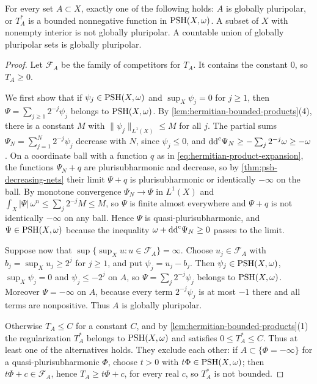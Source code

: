 \begin{lemma}\label{lem:hermitian-extremal-pole-alternative}
For every set $A\subset X$, exactly one of the following holds: $A$ is globally pluripolar, or $T_A^*$ is a bounded nonnegative function in $\mathrm{PSH}(X,\omega)$. A subset of $X$ with nonempty interior is not globally pluripolar. A countable union of globally pluripolar sets is globally pluripolar.
\end{lemma}
\begin{proof}
Let $\mathcal F_A$ be the family of competitors for $T_A$. It contains the constant $0$, so $T_A\geq0$.

We first show that if $\psi_j\in\mathrm{PSH}(X,\omega)$ and $\sup_X\psi_j=0$ for $j\geq1$, then $\Psi=\sum_{j\geq1}2^{-j}\psi_j$ belongs to $\mathrm{PSH}(X,\omega)$. By \cref{lem:hermitian-bounded-products}(4), there is a constant $M$ with $\|\psi_j\|_{L^1(X)}\leq M$ for all $j$. The partial sums $\Psi_N=\sum_{j=1}^N2^{-j}\psi_j$ decrease with $N$, since $\psi_j\leq0$, and $\mathrm{dd}^{\mathrm{c}}\Psi_N\geq-\sum_j2^{-j}\omega\geq-\omega$. On a coordinate ball with a function $q$ as in \eqref{eq:hermitian-product-expansion}, the functions $\Psi_N+q$ are plurisubharmonic and decrease, so by \cref{thm:psh-decreasing-nets} their limit $\Psi+q$ is plurisubharmonic or identically $-\infty$ on the ball. By monotone convergence $\Psi_N\to\Psi$ in $L^1(X)$ and $\int_X|\Psi|\,\omega^n\leq\sum_j2^{-j}M\leq M$, so $\Psi$ is finite almost everywhere and $\Psi+q$ is not identically $-\infty$ on any ball. Hence $\Psi$ is quasi-plurisubharmonic, and $\Psi\in\mathrm{PSH}(X,\omega)$ because the inequality $\omega+\mathrm{dd}^{\mathrm{c}}\Psi_N\geq0$ passes to the limit.

Suppose now that $\sup\{\sup_Xu:u\in\mathcal F_A\}=\infty$. Choose $u_j\in\mathcal F_A$ with $b_j=\sup_Xu_j\geq2^j$ for $j\geq1$, and put $\psi_j=u_j-b_j$. Then $\psi_j\in\mathrm{PSH}(X,\omega)$, $\sup_X\psi_j=0$ and $\psi_j\leq-2^j$ on $A$, so $\Psi=\sum_j2^{-j}\psi_j$ belongs to $\mathrm{PSH}(X,\omega)$. Moreover $\Psi=-\infty$ on $A$, because every term $2^{-j}\psi_j$ is at most $-1$ there and all terms are nonpositive. Thus $A$ is globally pluripolar.

Otherwise $T_A\leq C$ for a constant $C$, and by \cref{lem:hermitian-bounded-products}(1) the regularization $T_A^*$ belongs to $\mathrm{PSH}(X,\omega)$ and satisfies $0\leq T_A^*\leq C$. Thus at least one of the alternatives holds. They exclude each other: if $A\subset\{\Phi=-\infty\}$ for a quasi-plurisubharmonic $\Phi$, choose $t>0$ with $t\Phi\in\mathrm{PSH}(X,\omega)$; then $t\Phi+c\in\mathcal F_A$, hence $T_A\geq t\Phi+c$, for every real $c$, so $T_A^*$ is not bounded.


\end{proof}
